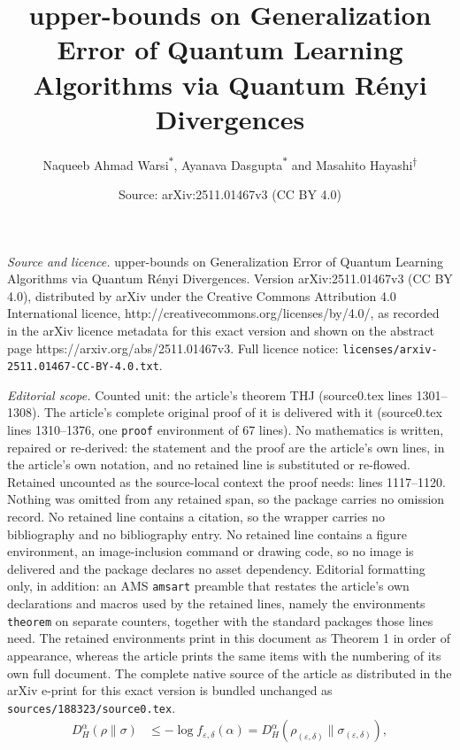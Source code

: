 \documentclass[10pt,a4paper]{amsart}
\title{upper-bounds on Generalization Error of Quantum Learning Algorithms via Quantum R\'enyi Divergences}
\author{Naqueeb Ahmad Warsi\textsuperscript{$*$}, Ayanava Dasgupta\textsuperscript{$*$} and Masahito Hayashi\textsuperscript{$\dagger$}}
\date{Source: arXiv:2511.01467v3 (CC BY 4.0)}
\newcommand{\eps}{\varepsilon}
\begin{document}
\maketitle

\noindent\emph{Source and licence.} upper-bounds on Generalization Error of Quantum Learning Algorithms via Quantum R\'enyi Divergences. Version arXiv:2511.01467v3 (CC BY 4.0), distributed by arXiv under the Creative Commons Attribution 4.0 International licence, http://creativecommons.org/licenses/by/4.0/, as recorded in the arXiv licence metadata for this exact version and shown on the abstract page https://arxiv.org/abs/2511.01467v3. Full licence notice: \texttt{licenses/arxiv-2511.01467-CC-BY-4.0.txt}.\par\smallskip

\noindent\textit{Editorial scope.} Counted unit: the article's theorem THJ (source0.tex lines 1301--1308). The article's complete original proof of it is delivered with it (source0.tex lines 1310--1376, one \texttt{proof} environment of 67 lines). No mathematics is written, repaired or re-derived: the statement and the proof are the article's own lines, in the article's own notation, and no retained line is substituted or re-flowed.  Retained uncounted as the source-local context the proof needs: lines 1117--1120.  Nothing was omitted from any retained span, so the package carries no omission record.  No retained line contains a citation, so the wrapper carries no bibliography and no bibliography entry.  No retained line contains a figure environment, an image-inclusion command or drawing code, so no image is delivered and the package declares no asset dependency.  Editorial formatting only, in addition: an AMS \texttt{amsart} preamble that restates the article's own declarations and macros used by the retained lines, namely the environments \texttt{theorem} on separate counters, together with the standard packages those lines need.  The retained environments print in this document as Theorem 1 in order of appearance, whereas the article prints the same items with the numbering of its own full document.  The complete native source of the article as distributed in the arXiv e-print for this exact version is bundled unchanged as \texttt{sources/188323/source0.tex}.
    \begin{align}
        D^{\alpha}_{H}(\rho\|\sigma) &\leq -\log f_{\eps,\delta}(\alpha)
        = D^{\alpha}_{H}(\rho_{(\eps,\delta)}\|\sigma_{(\eps,\delta)}),\label{theo_QLDP_approx_F_div_eq1}
    \end{align}
\end{document}
